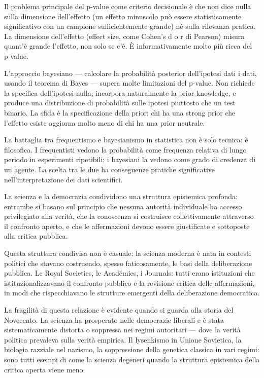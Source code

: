 \documentclass[12pt,a4paper,openany]{book}
\newcommand{\sezione}[1]{\vspace{1.2em}{\large\bfseries #1}\vspace{0.5em}\par}
\begin{document}
Il problema principale del p-value come criterio decisionale è che non dice nulla sulla dimensione dell'effetto (un effetto minuscolo può essere statisticamente significativo con un campione sufficientemente grande) né sulla rilevanza pratica. La dimensione dell'effetto (effect size, come Cohen's d o r di Pearson) misura quant'è grande l'effetto, non solo se c'è. È informativamente molto più ricca del p-value.

L'approccio bayesiano --- calcolare la probabilità posterior dell'ipotesi dati i dati, usando il teorema di Bayes --- supera molte limitazioni del p-value. Non richiede la specifica dell'ipotesi nulla, incorpora naturalmente la prior knowledge, e produce una distribuzione di probabilità sulle ipotesi piuttosto che un test binario. La sfida è la specificazione della prior: chi ha una strong prior che l'effetto esiste aggiorna molto meno di chi ha una prior neutrale.

La battaglia tra frequentismo e bayesianismo in statistica non è solo tecnica: è filosofica. I frequentisti vedono la probabilità come frequenza relativa di lungo periodo in esperimenti ripetibili; i bayesiani la vedono come grado di credenza di un agente. La scelta tra le due ha conseguenze pratiche significative nell'interpretazione dei dati scientifici.

\sezione{Scienza e democrazia: una relazione necessaria e fragile}

La scienza e la democrazia condividono una struttura epistemica profonda: entrambe si basano sul principio che nessuna autorità individuale ha accesso privilegiato alla verità, che la conoscenza si costruisce collettivamente attraverso il confronto aperto, e che le affermazioni devono essere giustificate e sottoposte alla critica pubblica.

Questa struttura condivisa non è casuale: la scienza moderna è nata in contesti politici che stavano costruendo, spesso faticosamente, le basi della deliberazione pubblica. Le Royal Societies, le Académies, i Journals: tutti erano istituzioni che istituzionalizzavano il confronto pubblico e la revisione critica delle affermazioni, in modi che rispecchiavano le strutture emergenti della deliberazione democratica.

La fragilità di questa relazione è evidente quando si guarda alla storia del Novecento. La scienza ha prosperato nelle democrazie liberali e è stata sistematicamente distorta o soppressa nei regimi autoritari --- dove la verità politica prevaleva sulla verità empirica. Il lysenkismo in Unione Sovietica, la biologia razziale nel nazismo, la soppressione della genetica classica in vari regimi: sono tutti esempi di come la scienza degeneri quando la struttura epistemica della critica aperta viene meno.
\end{document}
